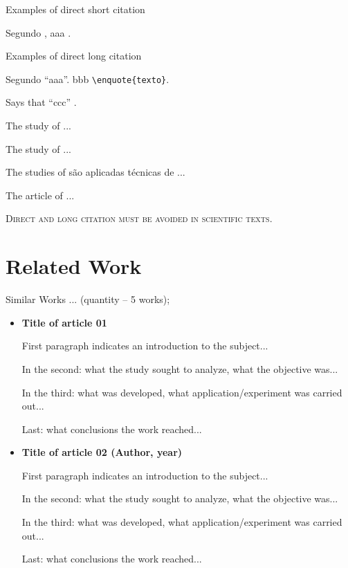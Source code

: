 
    
    \begin{description}
        \item[Examples of direct short citation]    
    \end{description}
    
    Segundo \textcite{spinello2024}, aaa \cite{spinello2024}.
    
    \begin{description}
        \item[Examples of direct long citation]
    \end{description}
    
    Segundo \textcite{spinello2024} \enquote{aaa}. bbb \verb|\enquote{texto}|.
    
    Says that \enquote{ccc} \cite{spinello2024}.
    
    The study of \textcite[p. 107]{rabello2010} ...
    
    The study of \textcite{pargaonkar2021} ...
    
    The studies of \textcites{badgujar2024}{pargaonkar2021} são aplicadas técnicas de ...
    
    The article of \textcite{estevao2023} ...
    
    \textsc{Direct and long citation must be avoided in scientific texts.}
    
    \section{Related Work}
    
    Similar Works ... (quantity -- 5 works);
    
    \begin{itemize}
         \item \textbf{Title of article 01 \cite{ogliari2019}}
         
         First paragraph indicates an introduction to the subject...
         
         In the second: what the study sought to analyze, what the objective was...
         
         In the third: what was developed, what application/experiment was carried out...
         
         Last: what conclusions the work reached...
        \newline
        
        \item \textbf{Title of article 02 (Author, year)}
        
         First paragraph indicates an introduction to the subject...
         
         In the second: what the study sought to analyze, what the objective was...
         
         In the third: what was developed, what application/experiment was carried out...
         
         Last: what conclusions the work reached...
        
    \end{itemize}
    
